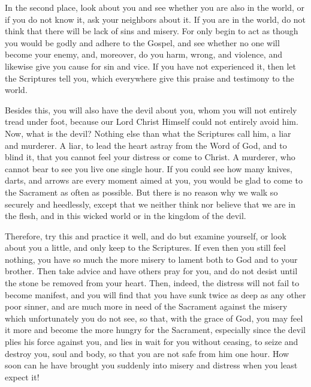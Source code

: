 In the second place, look about you and see whether you are also in the
world, or if you do not know it, ask your neighbors about it. If you
are in the world, do not think that there will be lack of sins and
misery. For only begin to act as though you would be godly and adhere
to the Gospel, and see whether no one will become your enemy, and,
moreover, do you harm, wrong, and violence, and likewise give you cause
for sin and vice. If you have not experienced it, then let the
Scriptures tell you, which everywhere give this praise and testimony to
the world.

Besides this, you will also have the devil about you, whom you will not
entirely tread under foot, because our Lord Christ Himself could not
entirely avoid him. Now, what is the devil? Nothing else than what the
Scriptures call him, a liar and murderer. A liar, to lead the heart
astray from the Word of God, and to blind it, that you cannot feel your
distress or come to Christ. A murderer, who cannot bear to see you live
one single hour. If you could see how many knives, darts, and arrows
are every moment aimed at you, you would be glad to come to the
Sacrament as often as possible. But there is no reason why we walk so
securely and heedlessly, except that we neither think nor believe that
we are in the flesh, and in this wicked world or in the kingdom of the
devil.

Therefore, try this and practice it well, and do but examine yourself,
or look about you a little, and only keep to the Scriptures. If even
then you still feel nothing, you have so much the more misery to lament
both to God and to your brother. Then take advice and have others pray
for you, and do not desist until the stone be removed from your heart.
Then, indeed, the distress will not fail to become manifest, and you
will find that you have sunk twice as deep as any other poor sinner,
and are much more in need of the Sacrament against the misery which
unfortunately you do not see, so that, with the grace of God, you may
feel it more and become the more hungry for the Sacrament, especially
since the devil plies his force against you, and lies in wait for you
without ceasing, to seize and destroy you, soul and body, so that you
are not safe from him one hour. How soon can he have brought you
suddenly into misery and distress when you least expect it!

